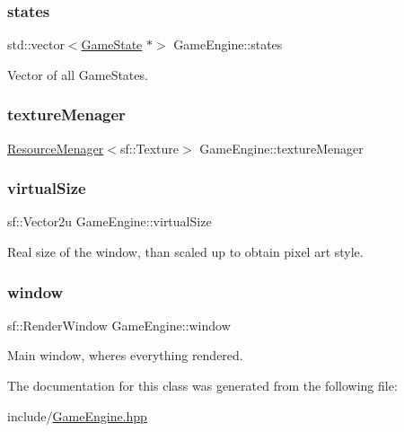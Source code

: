 \subsubsection{\texorpdfstring{states}{states}}
{\footnotesize\ttfamily std\+::vector$<$\mbox{\hyperlink{class_game_state}{Game\+State}} $\ast$$>$ Game\+Engine\+::states\hspace{0.3cm}{\ttfamily [private]}}



Vector of all Game\+States. 

\mbox{\label{class_game_engine_ab4b2a10f836b40e474862475b8fce137}} 
\subsubsection{\texorpdfstring{textureMenager}{textureMenager}}
{\footnotesize\ttfamily \mbox{\hyperlink{class_resource_menager}{Resource\+Menager}}$<$sf\+::\+Texture$>$ Game\+Engine\+::texture\+Menager}

\mbox{\label{class_game_engine_a57b84b09b731bc5664a22f0e517de4dc}} 
\subsubsection{\texorpdfstring{virtualSize}{virtualSize}}
{\footnotesize\ttfamily sf\+::\+Vector2u Game\+Engine\+::virtual\+Size\hspace{0.3cm}{\ttfamily [private]}}



Real size of the window, than scaled up to obtain pixel art style. 

\mbox{\label{class_game_engine_ac91a68b9e136eda3dc8cabcb46a5dbaa}} 
\subsubsection{\texorpdfstring{window}{window}}
{\footnotesize\ttfamily sf\+::\+Render\+Window Game\+Engine\+::window}



Main window, where\textquotesingle{}s everything rendered. 



The documentation for this class was generated from the following file\+:\begin{DoxyCompactItemize}
\item 
include/\mbox{\hyperlink{_game_engine_8hpp}{Game\+Engine.\+hpp}}\end{DoxyCompactItemize}
